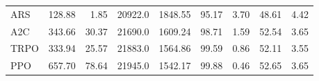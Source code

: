 \begin{samepage}
\begin{center}
\begin{tabular}{l|rr|rr|rr|rr}
    ARS          &   128.88 &     1.85 &    20922.0 &    1848.55 &   95.17 &    3.70 &   48.61 &    4.42 \\
    A2C          &   343.66 &    30.37 &    21690.0 &    1609.24 &   98.71 &    1.59 &   52.54 &    3.65 \\
    TRPO         &   333.94 &    25.57 &    21883.0 &    1564.86 &   99.59 &    0.86 &   52.11 &    3.55 \\
    PPO          &   657.70 &    78.64 &    21945.0 &    1542.17 &   99.88 &    0.46 &   52.65 &    3.65 \\
    \bottomrule
  \end{tabular}
\end{center}
\end{samepage}

